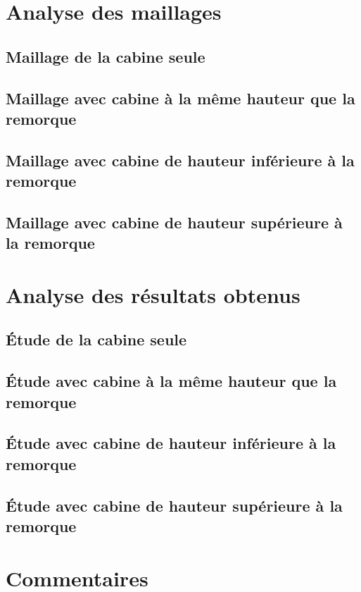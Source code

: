 \section{Analyse des maillages}

\subsection{Maillage de la cabine seule}

\subsection{Maillage avec cabine à la même hauteur que la remorque}

\subsection{Maillage avec cabine de hauteur inférieure à la remorque}

\subsection{Maillage avec cabine de hauteur supérieure à la remorque}


\section{Analyse des résultats obtenus}

\subsection{Étude de la cabine seule}

\subsection{Étude avec cabine à la même hauteur que la remorque}

\subsection{Étude avec cabine de hauteur inférieure à la remorque}

\subsection{Étude avec cabine de hauteur supérieure à la remorque}

\section{Commentaires}
